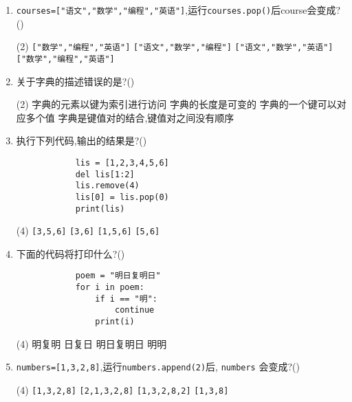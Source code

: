 \documentclass[11pt]{ctexart}
\begin{document}
\begin{enumerate}
        \item \lstinline!courses=["语文","数学","编程","英语"]!,运行\lstinline!courses.pop()!后course会变成?(\qquad)
        \begin{tasks}(2)
            \task \lstinline{["数学","编程","英语"]}
            \task \lstinline{["语文","数学","编程"]}
            \task \lstinline{["语文","数学","英语"]}
            \task \lstinline{["数学","编程","英语"]}
        \end{tasks}

        \item 关于字典的描述错误的是?(\qquad)
        \begin{tasks}(2)
            \task 字典的元素以键为索引进行访问
            \task 字典的长度是可变的
            \task 字典的一个键可以对应多个值
            \task 字典是键值对的结合,键值对之间没有顺序
        \end{tasks}

        \item 执行下列代码,输出的结果是?(\qquad)
        \begin{lstlisting}
            lis = [1,2,3,4,5,6]
            del lis[1:2]
            lis.remove(4)
            lis[0] = lis.pop(0)
            print(lis)
        \end{lstlisting}
        \begin{tasks}(4)
            \task \lstinline{[3,5,6]}
            \task \lstinline{[3,6]}
            \task \lstinline{[1,5,6]}
            \task \lstinline{[5,6]}
        \end{tasks}

        \newpage
        \item 下面的代码将打印什么?(\qquad)
        \begin{lstlisting}
            poem = "明日复明日"
            for i in poem:
                if i == "明":
                    continue
                print(i)
        \end{lstlisting}
        \begin{tasks}(4)
            \task 明复明
            \task 日复日
            \task 明日复明日
            \task 明明
        \end{tasks}
        
        \item \lstinline!numbers=[1,3,2,8]!,运行\lstinline!numbers.append(2)!后, \lstinline{numbers} 会变成?(\qquad)
        \begin{tasks}(4)
            \task \lstinline{[1,3,2,8]}
            \task \lstinline{[2,1,3,2,8]}
            \task \lstinline{[1,3,2,8,2]}
            \task \lstinline{[1,3,8]}
        \end{tasks}


\end{enumerate}
\end{document}
